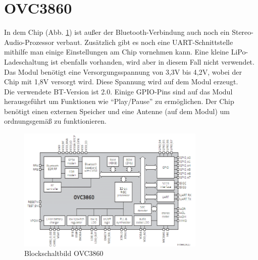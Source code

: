 \section{OVC3860}
In dem Chip (Abb. \ref {fig:abb2.1}) ist außer der Bluetooth-Verbindung auch noch ein Stereo-Audio-Prozessor verbaut. Zusätzlich gibt es noch eine UART-Schnittstelle mithilfe man einige Einstellungen am Chip vornehmen kann. Eine kleine LiPo-Ladeschaltung ist ebenfalls vorhanden, wird aber in diesem Fall nicht verwendet.\\
Das Modul benötigt eine Versorgungsspannung von 3,3V bis 4,2V, wobei der Chip mit 1,8V versorgt wird. Diese Spannung wird auf dem Modul erzeugt.\\
Die verwendete BT-Version ist 2.0. Einige GPIO-Pins sind auf das Modul herausgeführt um Funktionen wie \enquote{Play/Pause} zu ermöglichen. Der Chip benötigt einen externen Speicher und eine Antenne (auf dem Modul) um ordnungsgemäß zu funktionieren.
\begin{figure} [h]
	\centering
	\caption{Blockschaltbild OVC3860}
	\label {fig:abb2.1}
	\includegraphics[width=0.8\textwidth]{img/blockschaltbild.png}
\end{figure}


